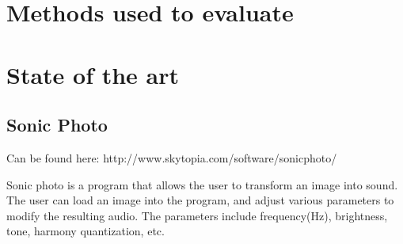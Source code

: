 \section{Methods used to evaluate}\label{sub:methodsusedtoevaluate}






\section{State of the art}\label{sec:stateart}

\subsection{Sonic Photo}\label{sub:sonic}
Can be found here: http://www.skytopia.com/software/sonicphoto/

Sonic photo is a program that allows the user to transform an image into sound. The user can load an image into the program, and adjust various parameters to modify the resulting audio. The parameters include  frequency(Hz), brightness, tone, harmony quantization, etc.

